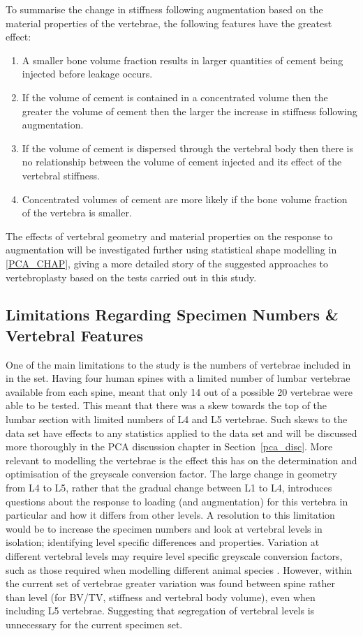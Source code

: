 To summarise the change in stiffness following augmentation based on the
material properties of the vertebrae, the following features have the greatest
effect:
\begin{enumerate} 
\item A smaller bone volume fraction results in larger quantities of cement
    being injected before leakage occurs.  
\item If the volume of cement is contained in a concentrated volume then the
    greater the volume of cement then the larger the increase in stiffness
    following augmentation.  
\item If the volume of cement is dispersed through the
    vertebral body then there is no relationship between the volume of cement
    injected and its effect of the vertebral stiffness.
\item Concentrated volumes of cement are more likely if the bone volume
fraction of the vertebra is smaller.
\end{enumerate}

The effects of vertebral geometry and material properties on the response to
augmentation will be investigated further using statistical shape modelling in
\cref{PCA_CHAP}, giving a more detailed story of the suggested approaches to
vertebroplasty based on the tests carried out in this study.

\subsection{Limitations Regarding Specimen Numbers \& Vertebral Features}

One of the main limitations to the study is the numbers of vertebrae included
in in the set.  Having four human spines with a limited number of lumbar
vertebrae available from each spine, meant that only 14 out of a possible 20
vertebrae were able to be tested.  This meant that there was a skew towards the
top of the lumbar section with limited numbers of L4 and L5 vertebrae.  Such
skews to the data set have effects to any statistics applied to the data set
and will be discussed more thoroughly in the PCA discussion chapter in
Section~\ref{pca_disc}.  More relevant to modelling the vertebrae is the effect
this has on the determination and optimisation of the greyscale conversion
factor.  The large change in geometry from L4 to L5, rather that the gradual
change between L1 to L4, introduces questions about the response to loading
(and augmentation) for this vertebra in particular and how it differs from
other levels.  A resolution to this limitation would be to increase the
specimen numbers and look at vertebral levels in isolation; identifying level
specific differences and properties.  Variation at different vertebral levels
may require level specific greyscale conversion factors, such as those required
when modelling different animal species \cite{zapata2017methodology}.  However,
within the current set of vertebrae greater variation was found between spine
rather than level (for BV/TV, stiffness and vertebral body volume), even when
including L5 vertebrae.  Suggesting that segregation of vertebral levels is
unnecessary for the current specimen set. 

